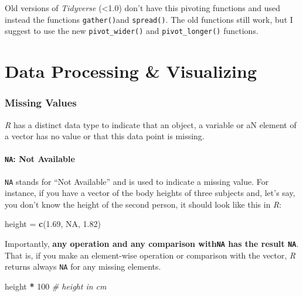\documentclass[
]{scrartcl}
\makeatletter
\newenvironment{Shaded}{\begin{snugshade}}{\end{snugshade}}
\newcommand{\CommentTok}[1]{\textcolor[rgb]{0.56,0.35,0.01}{\textit{#1}}}
\newcommand{\DecValTok}[1]{\textcolor[rgb]{0.00,0.00,0.81}{#1}}
\newcommand{\FloatTok}[1]{\textcolor[rgb]{0.00,0.00,0.81}{#1}}
\newcommand{\KeywordTok}[1]{\textcolor[rgb]{0.13,0.29,0.53}{\textbf{#1}}}
\newcommand{\NormalTok}[1]{#1}
\newcommand{\OperatorTok}[1]{\textcolor[rgb]{0.81,0.36,0.00}{\textbf{#1}}}
\newcommand{\OtherTok}[1]{\textcolor[rgb]{0.56,0.35,0.01}{#1}}
\newcommand{\StringTok}[1]{\textcolor[rgb]{0.31,0.60,0.02}{#1}}
\newenvironment{kframe}{%
\medskip{}
\setlength{\fboxsep}{.8em}
 \def\at@end@of@kframe{}%
 \ifinner\ifhmode%
  \def\at@end@of@kframe{\end{minipage}}%
  \begin{minipage}{\columnwidth}%
 \fi\fi%
 \def\FrameCommand##1{\hskip\@totalleftmargin \hskip-\fboxsep
 \colorbox{shadecolor}{##1}\hskip-\fboxsep
     \hskip-\linewidth \hskip-\@totalleftmargin \hskip\columnwidth}%
 \MakeFramed {\advance\hsize-\width
   \@totalleftmargin\z@ \linewidth\hsize
   \@setminipage}}%
 {\par\unskip\endMakeFramed%
 \at@end@of@kframe}
\newenvironment{rmdblock}[1]
  {
  \begin{itemize}
  \renewcommand{\labelitemi}{
    \raisebox{-.7\height}[0pt][0pt]{
      {\setkeys{Gin}{width=3em,keepaspectratio}\texttt{[image: images/\#1]}}
    }
  }
  \setlength{\fboxsep}{1em}
  \begin{kframe}
  \item
  }
  {
  \end{kframe}
  \end{itemize}
  }
\newenvironment{geek}
    {\begin{rmdblock}{geek}}
    {\end{rmdblock}}
\makeatother
\begin{document}
\begin{geek}
Old versions of \emph{Tidyverse} (\textless1.0) don't have this pivoting
functions and used instead the functions \texttt{gather()}and
\texttt{spread()}. The old functions still work, but I suggest to use
the new \texttt{pivot\_wider()} and \texttt{pivot\_longer()} functions.
\end{geek}

\newpage

\hypertarget{part-data-processing-visualizing}{%
\part{Data Processing \& Visualizing}\label{part-data-processing-visualizing}}

\hypertarget{missing-values}{%
\section{Missing Values}\label{missing-values}}

\emph{R} has a distinct data type to indicate that an object, a variable or aN element of a vector has no value or that this data point is missing.

\hypertarget{na-not-available}{%
\subsection{\texorpdfstring{\texttt{NA}: Not Available}{NA: Not Available}}\label{na-not-available}}

\texttt{NA} stands for ``Not Available'' and is used to indicate a missing value. For instance, if you have a vector of the body heights of three subjects and, let's say, you don't know the height of the second person, it should look like this in \emph{R}:

\begin{Shaded}
\begin{Highlighting}[]
\NormalTok{height =}\StringTok{ }\KeywordTok{c}\NormalTok{(}\FloatTok{1.69}\NormalTok{, }\OtherTok{NA}\NormalTok{, }\FloatTok{1.82}\NormalTok{)}
\end{Highlighting}
\end{Shaded}

Importantly, \textbf{any operation and any comparison with\texttt{NA} has the result \texttt{NA}}. That is, if you make an element-wise operation or comparison with the vector, \emph{R} returns always \texttt{NA} for any missing elements.

\begin{Shaded}
\begin{Highlighting}[]
\NormalTok{height }\OperatorTok{*}\StringTok{ }\DecValTok{100}  \CommentTok{\# height in cm}
\end{Highlighting}
\end{Shaded}
\end{document}
